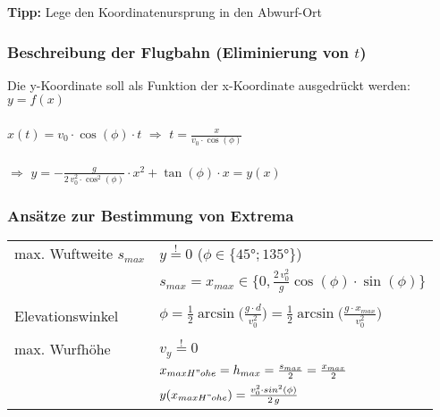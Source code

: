 	\textbf{Tipp:} Lege den Koordinatenursprung in den Abwurf-Ort
	
	
	
	\subsubsection{Beschreibung der Flugbahn (Eliminierung von $t$)}	
	Die y-Koordinate soll als Funktion der x-Koordinate ausgedrückt werden: $y = f(x)$ \\
	\\
	$x(t) = v_0 \cdot \cos(\phi) \cdot t$ \quad $\Rightarrow$ \quad $t = \frac{x}{v_0 \cdot \cos(\phi)}$ \\
	\\
	$\Rightarrow$ \quad $y = - \frac{g}{2 \, v_0^2 \cdot \cos^2(\phi)} \cdot x^2 + \tan(\phi) \cdot x = y(x)$
	
	
	\subsubsection{Ansätze zur Bestimmung von Extrema}
	
	\begin{tabular}{ll}
	max. Wuftweite $s_{max}$ & $y \overset{!}{=} 0 $ \quad ($\phi \in \{ 45° ; 135° \}$)\\
	& $s_{max} = x_{max} \in \{ 0, \frac{2 \, v_0^2}{g} \cos(\phi) \cdot \sin(\phi) \}$ \\
	\\
	Elevationswinkel & $\phi = \frac{1}{2} \arcsin \big( \frac{g \cdot d}{v_0^2} \big) = \frac{1}{2} \arcsin \big( \frac{g \cdot x_{max}}{v_0^2} \big)$ \\
	\\
	max. Wurfhöhe & $v_y \overset{!}{=} 0 $ \\
	& $x_{maxH"ohe} =  h_{max} = \frac{s_{max}}{2} = \frac{x_{max}}{2}$ \\
	& $y(x_{maxH"ohe}) = \frac{v_0^2 \cdot sin^2(\phi)}{2 \, g}$
	\end{tabular}
	
	
	
